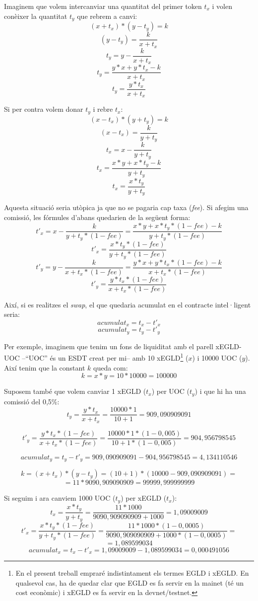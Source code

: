 \documentclass[11pt,a4paper]{article}
\begin{document}
Imaginem que volem intercanviar una quantitat del primer token \(t_x\) i volen conèixer la quantitat \(t_y\) que rebrem a canvi:
\[(x + t_x) * (y - t_y) = k\]
\[(y - t_y) = \frac{k}{x + t_x}\]
\[t_y = y - \frac{k}{x + t_x}\]
\[t_y = \frac{y * x + y * t_x - k}{x + t_x}\]
\[t_y = \frac{y * t_x}{x + t_x}\]

Si per contra volem donar \(t_y\) i rebre \(t_x\):
\[(x - t_x) * (y + t_y) = k\]
\[(x - t_x) = \frac{k}{y + t_y}\]
\[t_x = x - \frac{k}{y + t_y}\]
\[t_x = \frac{x * y + x * t_y - k}{y + t_y}\]
\[t_x = \frac{x * t_y}{y + t_y}\]

Aquesta situació seria utòpica ja que no se pagaria cap taxa (\textit{fee}). Si afegim una comissió, les fórmules d'abans quedarien de la següent forma:
\[t'_x = x - \frac{k}{y + t_y * (1 - fee)} = \frac{x * y + x * t_y *(1 - fee) - k}{y + t_y * (1 - fee)}\]
\[t'_x = \frac{x * t_y *(1 - fee)}{y + t_y * (1 - fee)}\]
\[t'_y = y - \frac{k}{x + t_x * (1 - fee)} = \frac{y * x + y * t_x * (1 - fee) - k}{x + t_x * (1 - fee)}\]
\[t'_y = \frac{y * t_x * (1 - fee)}{x + t_x * (1 - fee)}\]

Així, si es realitzes el \textit{swap}, el que quedaria acumulat en el contracte intel·ligent seria:
\[acumulat_x = t_x - t'_x\]
\[acumulat_y = t_y - t'_y\]

Per exemple, imaginem que tenim un fons de liquiditat amb el parell xEGLD-UOC –``UOC'' és un ESDT creat per mi– amb 10 xEGLD\footnote{En el present treball empraré indistintament els termes EGLD i xEGLD. En qualsevol cas, ha de quedar clar que EGLD es fa servir en la mainet (té un cost econòmic) i xEGLD es fa servir en la devnet/testnet.}  (\(x\)) i 10000 UOC (\(y\)). Així tenim que la constant \(k\) queda com:
\[k = x * y = 10 * 10000 = 100000\]


Suposem també que volem canviar 1 xEGLD (\(t_x\)) per UOC (\(t_y\)) i que hi ha una comissió del 0,5\%:
\[t_y = \frac{y * t_x}{x + t_x} = \frac{10000 * 1}{10 + 1} = 909,090909091\]

\[t'_y = \frac{y * t_x * (1 - fee)}{x + t_x * (1 - fee)} = \frac{10000 * 1 * (1 - 0,005)}{10 + 1 * (1 - 0,005)} = 904,956798545\]

\[acumulat_y = t_y - t'_y = 909,090909091 - 904,956798545 = 4,134110546\]

\[k = (x + t_x) * (y - t_y) = (10 + 1) * (10000 - 909,090909091) =\]
\[= 11 * 9090,909090909 = 99999,999999999\]

Si seguim i ara canviem 1000 UOC (\(t_y\)) per xEGLD (\(t_x\)):
\[t_x = \frac{x * t_y}{y + t_y} = \frac{11 * 1000}{9090,909090909 + 1000} = 1,09009009 \]
\[t'_x = \frac{x * t_y *(1 - fee)}{y + t_y * (1 - fee)} = \frac{11 * 1000 *(1 - 0,0005)}{9090,909090909 + 1000 * (1 - 0,0005)} =\]
\[= 1,089599034\]
\[acumulat_x = t_x - t'_x = 1,09009009 - 1,089599034 = 0,000491056\]
\end{document}
